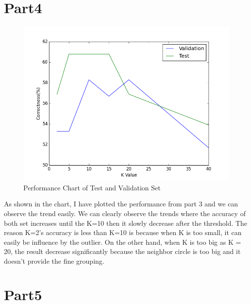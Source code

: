 \documentclass[12pt]{article} %
\begin{document}

\section{Part4} %

\begin{figure}[H] %
  \centering 
  \begin{minipage}[b]{0.7\textwidth}
    \includegraphics[width=\textwidth]{part4}
    \caption{Performance Chart of Test and Validation Set}
  \end{minipage}
\end{figure}

As shown in the chart, I have plotted the performance from part 3 and we can observe the trend easily. We can clearly observe the trends where the accuracy of both set increases until the K=10 then it slowly decrease after the threshold. The reason K=2’s accuracy is less than K=10 is because when K is too small, it can easily be influence by the outlier. On the other hand, when K is too big as K = 20, the result decrease significantly because the neighbor circle is too big and it doesn’t provide the fine grouping. 


\section{Part5} %
\end{document}
